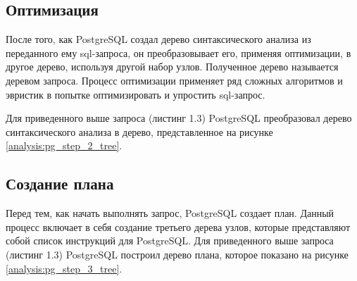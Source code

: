 \subsection{Оптимизация}

После того, как PostgreSQL создал дерево синтаксического анализа из переданного ему sql-запроса,
он преобразовывает его, применяя оптимизации, в другое дерево, используя другой набор узлов.
Полученное дерево называется деревом запроса.
Процесс оптимизации применяет ряд сложных алгоритмов и эвристик в 
попытке оптимизировать и упростить sql-запрос.

Для приведенного выше запроса (листинг 1.3) PostgreSQL преобразовал дерево 
синтаксического анализа в дерево,
представленное на рисунке \ref{analysis:pg_step_2_tree}.

\begin{figure}[ht!]
\end{figure}

\subsection{Создание плана}

Перед тем, как начать выполнять запрос, PostgreSQL создает план.
Данный процесс включает в себя создание третьего дерева узлов, 
которые представляют собой список инструкций для PostgreSQL.
Для приведенного выше запроса (листинг 1.3) PostgreSQL построил 
дерево плана, которое показано на рисунке \ref{analysis:pg_step_3_tree}.

